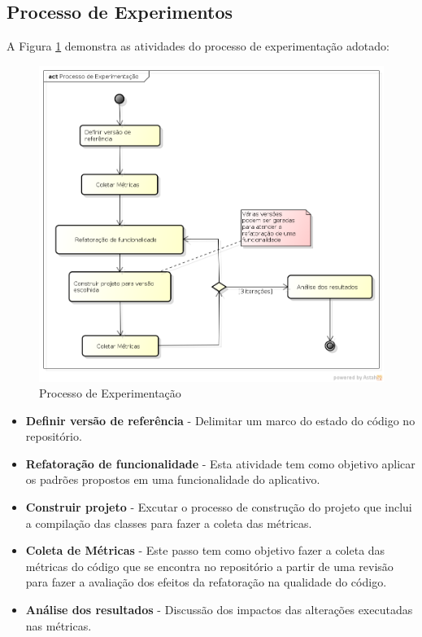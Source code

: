 \documentclass[conference]{IEEEtran}
\begin{document}
\subsection{Processo de Experimentos}


A Figura \ref{processo_experimentacao} demonstra as atividades do processo de
experimentação adotado:
\begin{figure}[!htb]
	\begin{center}
	\includegraphics[scale=0.35]{img/processo_experimentacao.png}
	\end{center}
	
	\caption{\label{processo_experimentacao} Processo de Experimentação}
\end{figure}

\begin{itemize}
\item \textbf{Definir versão de referência} - Delimitar um marco do estado do
código no repositório.
\item \textbf{Refatoração de funcionalidade} - Esta atividade tem como
objetivo aplicar os padrões propostos em uma funcionalidade do aplicativo.
\item \textbf{Construir projeto} - Excutar o processo de construção do
projeto que inclui a compilação das classes para fazer a coleta das métricas.
\item \textbf{Coleta de Métricas} - Este passo tem como objetivo fazer a coleta
das métricas do código que se encontra no repositório a partir de uma revisão
para fazer a avaliação dos efeitos da refatoração na qualidade do código.
\item \textbf{Análise dos resultados} - Discussão dos impactos das alterações
executadas nas métricas.
\end{itemize}
\end{document}
